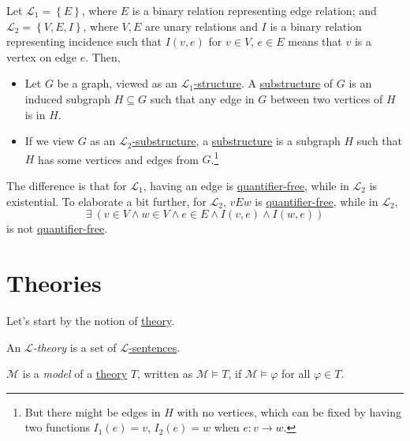 \begin{eg}
	Let \(\mathcal{L} _1 = \left\{ E \right\} \), where \(E\) is a binary relation representing edge relation; and \(\mathcal{L} _2 = \left\{ V, E, I \right\} \), where \(V, E\) are unary relations and \(I\) is a binary relation representing incidence such that \(I(v, e)\) for \(v\in V\), \(e\in E\) means that \(v\) is a vertex on edge \(e\). Then,
	\begin{itemize}
		\item Let \(G\) be a graph, viewed as an \hyperref[def:structure]{\(\mathcal{L} _1\)-structure}. A \hyperref[def:substructure]{substructure} of \(G\) is an induced subgraph \(H \subseteq G\) such that any edge in \(G\) between two vertices of \(H\) is in \(H\).
		\item If we view \(G\) as an \hyperref[def:substructure]{\(\mathcal{L} _2\)-substructure}, a \hyperref[def:substructure]{substructure} is a subgraph \(H\) such that \(H\) has some vertices and edges from \(G\).\footnote{But there might be edges in \(H\) with no vertices, which can be fixed by having two functions \(I_1(e)=v\), \(I_2(e)=w\) when \(e\colon v \to w\).}
	\end{itemize}
\end{eg}

The difference is that for \(\mathcal{L} _1\), having an edge is \hyperref[not:quantifier-free-formula]{quantifier-free}, while in \(\mathcal{L} _2\) is existential. To elaborate a bit further, for \(\mathcal{L} _2\), \(vEw\) is \hyperref[not:quantifier-free-formula]{quantifier-free}, while in \(\mathcal{L} _2\),
\[
	\exists \ (v\in V \land w\in V \land e\in E \land I(v, e) \land I(w, e))
\]
is not \hyperref[not:quantifier-free-formula]{quantifier-free}.

\section{Theories}
Let's start by the notion of \hyperref[def:theory]{theory}.

\begin{definition}[Theory]\label{def:theory}
	An \emph{\(\mathcal{L}\)-theory} is a set of \hyperref[def:sentence]{\(\mathcal{L} \)-sentences}.
\end{definition}

\begin{definition}[Model]\label{def:model}
	\(\mathcal{M} \) is a \emph{model} of a \hyperref[def:theory]{theory} \(T\), written as \(\mathcal{M} \models T\), if \(\mathcal{M} \models \varphi \) for all \(\varphi \in T\).
\end{definition}

